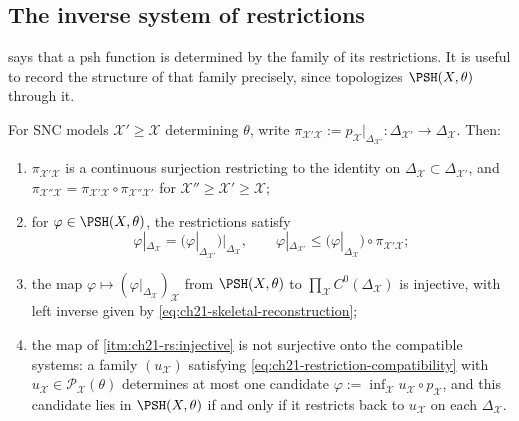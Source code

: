 \subsection{The inverse system of restrictions}
\label{sec:ch21-inverse-system}

 says that a psh function is
determined by the family of its restrictions.  It is useful to record the
structure of that family precisely, since 
topologizes \(\PSH(X,\theta)\) through it.

\begin{proposition}
\label{prop:ch21-restriction-system}
For SNC models \(\mathcal X'\geq\mathcal X\) determining \(\theta\), write
\(\pi_{\mathcal X'\mathcal X}:=p_{\mathcal X}|_{\Delta_{\mathcal X'}}:
\Delta_{\mathcal X'}\to\Delta_{\mathcal X}\).  Then:
\begin{enumerate}
\item\label{itm:ch21-rs:transition}
\(\pi_{\mathcal X'\mathcal X}\) is a continuous surjection restricting to
the identity on \(\Delta_{\mathcal X}\subset\Delta_{\mathcal X'}\), and
\(\pi_{\mathcal X''\mathcal X}=\pi_{\mathcal X'\mathcal X}\circ
\pi_{\mathcal X''\mathcal X'}\) for
\(\mathcal X''\geq\mathcal X'\geq\mathcal X\);
\item\label{itm:ch21-rs:compat}
for \(\varphi\in\PSH(X,\theta)\), the restrictions satisfy
\begin{equation}
\label{eq:ch21-restriction-compatibility}
 \varphi|_{\Delta_{\mathcal X}}
 =\bigl(\varphi|_{\Delta_{\mathcal X'}}\bigr)\big|_{\Delta_{\mathcal X}},
 \qquad
 \varphi|_{\Delta_{\mathcal X'}}
 \leq\bigl(\varphi|_{\Delta_{\mathcal X}}\bigr)\circ
     \pi_{\mathcal X'\mathcal X};
\end{equation}
\item\label{itm:ch21-rs:injective}
the map
\(\varphi\mapsto(\varphi|_{\Delta_{\mathcal X}})_{\mathcal X}\) from
\(\PSH(X,\theta)\) to \(\prod_{\mathcal X}C^0(\Delta_{\mathcal X})\) is
injective, with left inverse given by
\eqref{eq:ch21-skeletal-reconstruction};
\item\label{itm:ch21-rs:notsurjective}
the map of \cref{itm:ch21-rs:injective} is not surjective onto the compatible
systems: a family \((u_{\mathcal X})\) satisfying
\eqref{eq:ch21-restriction-compatibility} with
\(u_{\mathcal X}\in\mathcal P_{\mathcal X}(\theta)\) determines at most one
candidate \(\varphi:=\inf_{\mathcal X}u_{\mathcal X}\circ p_{\mathcal X}\),
and this candidate lies in \(\PSH(X,\theta)\) if and only if it restricts
back to \(u_{\mathcal X}\) on each \(\Delta_{\mathcal X}\).
\end{enumerate}
\end{proposition}

